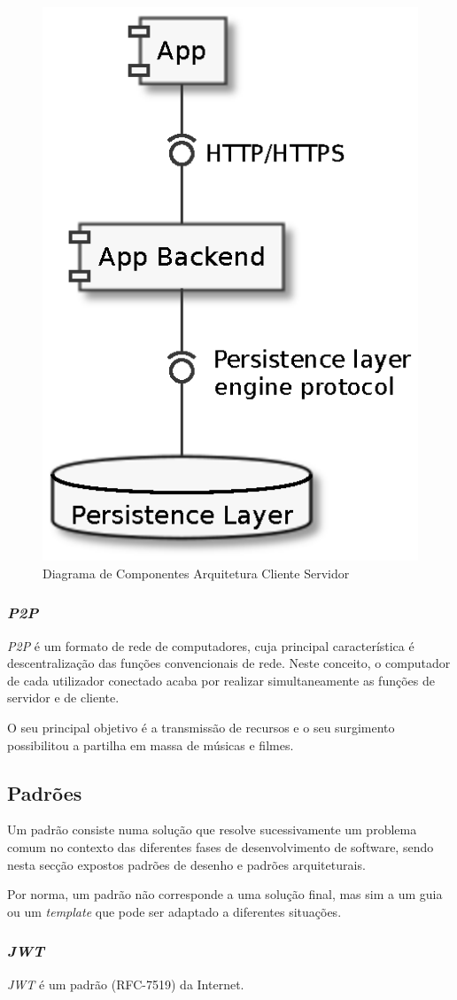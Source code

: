 \begin{figure}[H]
    \begin{center}
    \includegraphics[height=0.5 \textwidth]{figures/actual_web.eps}
    \caption{Diagrama de Componentes Arquitetura Cliente Servidor}
    \end{center}
\end{figure}

\subsubsection*{\emph{\acrshort{P2P}} \label{subsection:p2p}}
\emph{\acrshort{P2P}} é um formato de rede de computadores, cuja principal característica é descentralização das funções convencionais de rede. Neste conceito, o computador de cada utilizador conectado acaba por realizar simultaneamente as funções de servidor e de cliente\cite{what_are_P2P_networks}.

O seu principal objetivo é a transmissão de recursos e o seu surgimento possibilitou a partilha em massa de músicas e filmes\cite{what_are_P2P_networks}.

\subsection{Padrões}
Um padrão consiste numa solução que resolve sucessivamente um problema comum no contexto das diferentes fases de desenvolvimento de software, sendo nesta secção expostos padrões de desenho e padrões arquiteturais. 

Por norma, um padrão não corresponde a uma solução final, mas sim a um guia ou um \emph{template} que pode ser adaptado a diferentes situações\cite{clean_architecture}.

\subsubsection*{\emph{\acrfull{JWT}}\label{subsection:jwt}}
\emph{\acrshort{JWT}} é um padrão (RFC-7519) da Internet.


